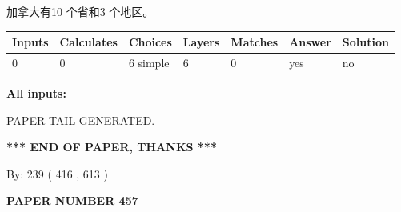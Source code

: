 \documentclass{ctexart}
\begin{document}
 
加拿大有10 个省和3 个地区。
 
 
\noindent{}
 
 
   
   
   
   
\noindent\begin{tabular}{|l|l|l|l|l|l|l|}
 \hline
Inputs & Calculates & Choices & Layers & Matches & Answer & Solution \\ \hline
 0  & 
 0  & 
 6
  simple  
  & 
 6  & 
 0  & 
  yes & 
  no 
  \\ \hline
 \end{tabular}
   
   
   
   
\noindent{}
   
   
   
   
\noindent\vspace{0.1in}\hspace{-0.08in} {\textbf{\Large{All inputs: }}}
   
   
   
   
   
   
 \vspace{0.2in}
 
   
   
\vspace{2.0in} PAPER TAIL GENERATED.
   
   
   
   
\vspace{1.0in} 
{\textbf{\large{ *** END OF PAPER, THANKS *** }}} 
   
   
\hspace{1.0in} By: 
 239 ( 416 ,  613 )
   
   
   
   
\newpage 
\setcounter{page}{ 
   457001 } 
   
   
   
   
 {\textbf{ \Large{ PAPER NUMBER  457  }}}
   
   
\vspace{0.2in}
   
   
   
   
   
   
   
\end{document}
